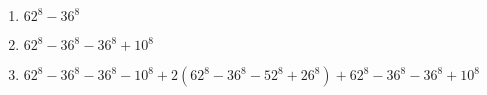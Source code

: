 \begin{enumerate}[label=(\alph*)]

\item $62^{8} - 36^{8}$

\item $62^{8} - 36^{8} - 36^{8} + 10^{8}$

\item $62^{8} - 36^{8} - 36^{8} - 10^{8} + 2(62^{8} - 36^{8} - 52^{8} + 26^{8}) + 62^{8} - 36^{8} - 36^{8} + 10^{8}$

\end{enumerate}
